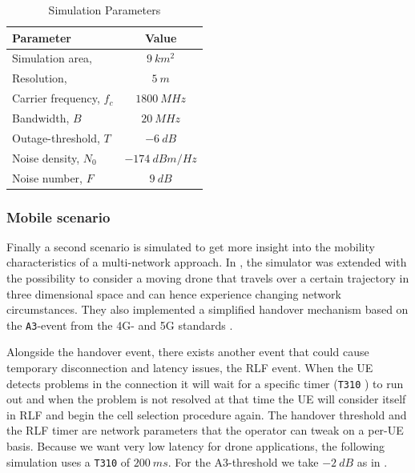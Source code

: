 \documentclass[conference,twocolumn,a4paper]{IEEEtran}
\begin{document}

\begin{table}[h!]
	\begin{center}
	  \caption{Simulation Parameters}
	  \label{tab:general_simparams}
	  \begin{tabular}{|l|c|} %
		\hline
		\textbf{Parameter} & \textbf{Value}\\
		\hline
		Simulation area, & $9~km^2$\\
		Resolution, & $5~m$\\
		Carrier frequency, $f_c$& $1800~MHz$\\
		Bandwidth, $B$ & $20~MHz$\\
		Outage-threshold, $T$ & $-6~dB$\\
		Noise density, $N_0$ \cite{3gppRadioFrequencyRF2018} & $-174~dBm/Hz$\\
		Noise number, $F$ \cite{3gppRadioFrequencyRF2018} & $9~dB$\\
		\hline

	  \end{tabular}
	\end{center}
  \end{table}
  
\subsubsection{Mobile scenario}

\par Finally a second scenario is simulated to get more insight into the mobility characteristics of a multi-network approach. In \cite{colpaert2020beamforming}, the simulator was extended with the possibility to consider a moving drone that travels over a certain trajectory in three dimensional space and can hence experience changing network circumstances. They also implemented a simplified handover mechanism based on the \verb+A3+-event from the 4G- and 5G standards \cite{3gpp2021NR}.

\par Alongside the handover event, there exists another event that could cause temporary disconnection and latency issues, the
RLF event. When the UE detects problems in the connection it will wait for a specific timer (\verb+T310+ \cite{3gpp2021NR}) to run out and when the problem is not resolved at that time the UE will consider itself in RLF and begin the cell selection procedure again. The handover threshold and the RLF timer are network parameters that the operator can tweak on a per-UE basis. Because we want very low latency for drone applications, the following simulation uses a \verb+T310+ of $200~ms$. For the A3-threshold we take $-2~dB$ as in \cite{3gpp2018enhanced}.
\end{document}
